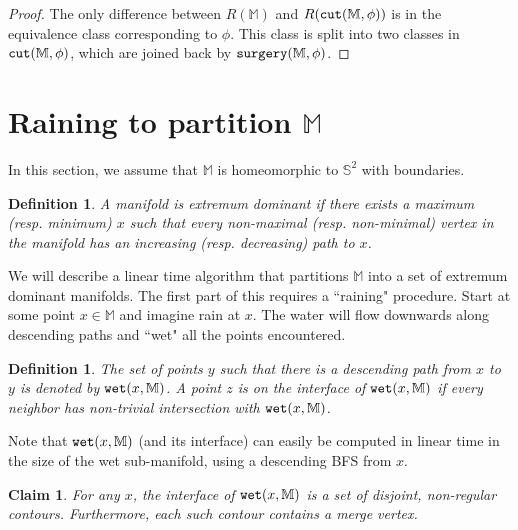 \documentclass[11pt]{article}
\newtheorem{claim}[theorem]{Claim}
\newtheorem{definition}[theorem]{Definition}
\theoremstyle{definition}
\newcommand{\MM}{\mathbb{M}}
\newcommand{\SSS}{\mathbb{S}}
\newcommand{\cut}{{\tt cut}}
\newcommand{\reeb}{R}
\newcommand{\surgery}{{\tt surgery}}
\newcommand{\wet}{{\tt wet}}
\begin{document}
\begin{proof} The only difference between $\reeb(\MM)$ and $\reeb(\cut(\MM,\phi))$ is in the equivalence
class corresponding to $\phi$. This class is split into two classes in $\cut(\MM,\phi)$, which are joined
back by $\surgery(\MM,\phi)$.
\end{proof}

\section{Raining to partition $\MM$} \label{sec:rain}

In this section, we assume that $\MM$ is homeomorphic to $\SSS^2$ with boundaries. 

\begin{definition} \label{def:dom} A manifold is \emph{extremum dominant} if there exists
a maximum (resp. minimum) $x$ such that every non-maximal (resp. non-minimal) \emph{vertex} in the manifold has an increasing (resp. decreasing) path to $x$.
\end{definition}

We will describe a linear time algorithm that partitions $\MM$ into a set of extremum dominant manifolds.
The first part of this requires a ``raining" procedure. Start at some point $x \in \MM$ and imagine rain at $x$.
The water will flow downwards along descending paths and ``wet" all the points encountered.

\begin{definition} \label{def:wet} The set of points $y$ such that there is a descending path from $x$ to $y$
is denoted by $\wet(x,\MM)$. A point $z$ is on the \emph{interface} of $\wet(x,\MM)$ if every neighbor
has non-trivial intersection with $\wet(x,\MM)$.
\end{definition}

Note that $\wet(x,\MM)$ (and its interface) can easily be computed in linear time in the size of the wet sub-manifold, using a descending BFS from $x$.

\begin{claim} \label{clm:inter} For any $x$, the interface of $\wet(x,\MM)$ is a set of disjoint, non-regular contours.
Furthermore, each such contour contains a merge vertex.
\end{claim}
\end{document}
